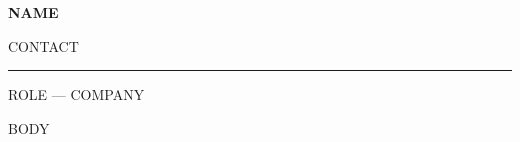 \documentclass[11pt,a4paper]{article}
\begin{document}
{\Large\bfseries {{NAME}}}\par
\vspace{2pt}
{\small {{CONTACT}}}\par
\vspace{18pt}
\hrule
\vspace{18pt}

{\small {{ROLE}} — {{COMPANY}}}\par
\vspace{16pt}

{{BODY}}
\end{document}
